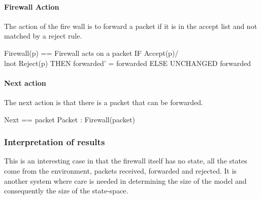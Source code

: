 \documentclass[12pt]{article}
\begin{document}
\paragraph{Firewall Action}
The action of the fire wall is to forward a packet if it is in the accept list
and not matched by a reject rule.
\begin{tla}
Firewall(p) == \* Firewall acts on a packet
    IF Accept(p)/\\lnot Reject(p)
    THEN forwarded' = forwarded 
    ELSE UNCHANGED forwarded
\end{tla}
\begin{tlatex}
%
%
\@xx{}%
%
%
%
\end{tlatex}

\paragraph{Next action}
The next action is that there is a packet that can be forwarded.
\begin{tla}
Next ==
    \E packet \in Packet : Firewall(packet)
\end{tla}
\begin{tlatex}
%
%
\end{tlatex}


\subsubsection{Interpretation of results}
This is an interesting case in that the firewall itself has no state, all the
states come from the environment, packets received, forwarded and rejected.
It is another system where care is needed in determining the size of the model
and consequently the size of the state-space.
\end{document}
